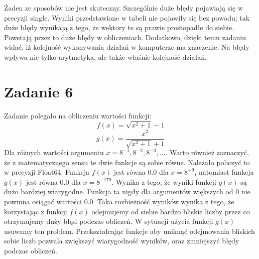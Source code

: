 \documentclass{article}
\begin{document}
\begin{center}
\end{center}
Żaden ze sposobów nie jest skuteczny. Szczególnie duże błędy pojawiają się w precyzji single. Wyniki przedstawione w tabeli nie pojawiły się bez powodu; tak duże błędy wynikają z tego, że wektory te są prawie prostopadłe do siebie. Powstają przez to duże błędy w obliczeniach. Dodatkowo, dzięki temu zadaniu widać, iż kolejność wykonywania działań w komputerze ma znaczenie. Na błędy wpływa nie tylko arytmetyka, ale także właśnie kolejność działań.
\section*{Zadanie 6}
Zadanie polegało na obliczeniu wartości funkcji:
\[
f(x) = \sqrt{x^2 + 1} - 1
\]
\[
g(x) = \frac{x^2}{\sqrt{x^2 + 1} + 1}
\]
Dla różnych wartości argumentu \( x = 8^{-1}, 8^{-2}, 8^{-3}, \dots \). Warto również zaznaczyć, że z matematycznego sensu te dwie funkcje są  sobie równe. Należało policzyć to w precyzji Float64.
Funkcja \(f(x)\) jest równa 0.0 dla \(x = 8^{-9}\), natomiast funkcja \(g(x)\) jest równa 0.0 dla \(x = 8^{-179}\). Wynika z tego, że wyniki funkcji \(g(x)\) są dużo bardziej wiarygodne. Funkcja ta nigdy dla argumentów większych od 0 nie powinna osiągać wartości 0.0. Taka rozbieżność wyników wynika z tego, że korzystając z funkcji \(f(x)\) odejmujemy od siebie bardzo bliskie liczby przez co otrzymujemy duży błąd podczas obliczeń. W sytuacji użycia funkcji \(g(x)\) usuwamy ten problem. Przekształcając funkcje aby uniknąć odejmowania bliskich sobie liczb pozwala zwiększyć wiarygodność wyników, oraz zmniejszyć błędy podczas obliczeń.
\end{document}
